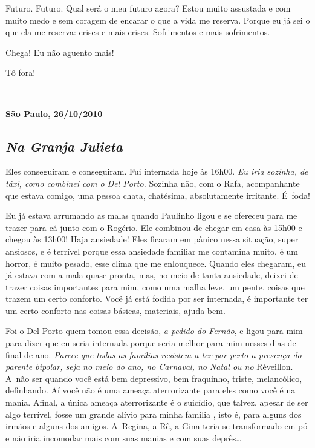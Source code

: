 Futuro. Futuro. Qual será o meu futuro agora? Estou muito assustada e
com muito medo e sem coragem de encarar o que a vida me reserva. Porque
eu já sei o que ela me reserva: crises e mais crises. Sofrimentos e mais
sofrimentos.

Chega! Eu não aguento mais!

Tô fora!

\begin{center}\asterisc{}​\end{center}

\begin{flushright}\textbf{São Paulo, 26/10/2010}\end{flushright}


\subsection{\emph{Na Granja Julieta}}

Eles conseguiram e conseguiram. Fui internada hoje às 16h00. \emph{Eu
iria sozinha, de táxi, como combinei com o Del Porto.} Sozinha não, com
o Rafa, acompanhante que estava comigo, uma pessoa chata, chatésima,
absolutamente irritante. É~foda!

Eu já estava arrumando as malas quando Paulinho ligou e se ofereceu para
me trazer para cá junto com o Rogério. Ele combinou de chegar em casa às
15h00 e chegou às 13h00! Haja ansiedade! Eles ficaram em pânico nessa
situação, super ansiosos, e é terrível porque essa ansiedade familiar me
contamina muito, é um horror, é muito pesado, esse clima que me
enlouquece. Quando eles chegaram, eu já estava com a mala quase pronta,
mas, no meio de tanta ansiedade, deixei de trazer coisas importantes
para mim, como uma malha leve, um pente, coisas que trazem um certo
conforto. Você já está fodida por ser internada, é importante ter um
certo conforto nas coisas básicas, materiais, ajuda bem.

Foi o Del Porto quem tomou essa decisão, \emph{a pedido do Fernão}, e
ligou para mim para dizer que eu seria internada porque seria melhor
para mim nesses dias de final de ano. \emph{Parece que todas as famílias
resistem a ter por perto a presença do parente bipolar, seja no meio do
ano, no Carnaval, no Natal ou no}\textbf{} Réveillon. A~não ser quando
você está bem depressivo, bem fraquinho, triste, melancólico,
definhando. Aí você não é uma ameaça aterrorizante para eles como você é
na mania. Afinal, a única ameaça aterrorizante é o suicídio, que talvez,
apesar de ser algo terrível, fosse um grande alívio para minha família ,
isto é, para alguns dos irmãos e alguns dos amigos. A~Regina, a Rê, a
Gina teria se transformado em pó e não iria incomodar mais com suas
manias e com suas deprês…

